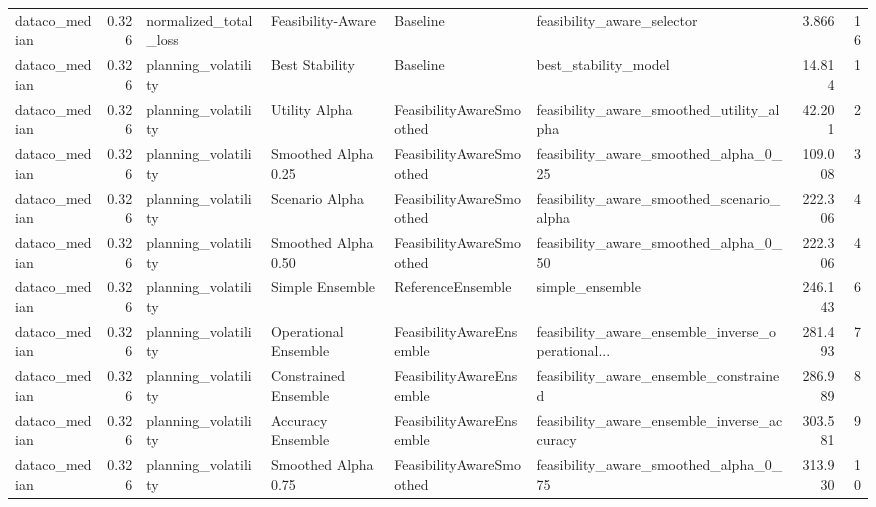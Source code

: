 \begin{table}
{\begin{tabular}{lrllllrr}
 dataco\_median &             0.326 &       normalized\_total\_loss &     Feasibility-Aware &                  Baseline &                         feasibility\_aware\_selector &         3.866 &              16 \\
 dataco\_median &             0.326 &         planning\_volatility &        Best Stability &                  Baseline &                               best\_stability\_model &        14.814 &               1 \\
 dataco\_median &             0.326 &         planning\_volatility &         Utility Alpha &  FeasibilityAwareSmoothed &           feasibility\_aware\_smoothed\_utility\_alpha &        42.201 &               2 \\
 dataco\_median &             0.326 &         planning\_volatility &   Smoothed Alpha 0.25 &  FeasibilityAwareSmoothed &              feasibility\_aware\_smoothed\_alpha\_0\_25 &       109.008 &               3 \\
 dataco\_median &             0.326 &         planning\_volatility &        Scenario Alpha &  FeasibilityAwareSmoothed &          feasibility\_aware\_smoothed\_scenario\_alpha &       222.306 &               4 \\
 dataco\_median &             0.326 &         planning\_volatility &   Smoothed Alpha 0.50 &  FeasibilityAwareSmoothed &              feasibility\_aware\_smoothed\_alpha\_0\_50 &       222.306 &               4 \\
 dataco\_median &             0.326 &         planning\_volatility &       Simple Ensemble &         ReferenceEnsemble &                                    simple\_ensemble &       246.143 &               6 \\
 dataco\_median &             0.326 &         planning\_volatility &  Operational Ensemble &  FeasibilityAwareEnsemble &  feasibility\_aware\_ensemble\_inverse\_operational... &       281.493 &               7 \\
 dataco\_median &             0.326 &         planning\_volatility &  Constrained Ensemble &  FeasibilityAwareEnsemble &             feasibility\_aware\_ensemble\_constrained &       286.989 &               8 \\
 dataco\_median &             0.326 &         planning\_volatility &     Accuracy Ensemble &  FeasibilityAwareEnsemble &        feasibility\_aware\_ensemble\_inverse\_accuracy &       303.581 &               9 \\
 dataco\_median &             0.326 &         planning\_volatility &   Smoothed Alpha 0.75 &  FeasibilityAwareSmoothed &              feasibility\_aware\_smoothed\_alpha\_0\_75 &       313.930 &              10 \\

\end{tabular}}
\end{table}
